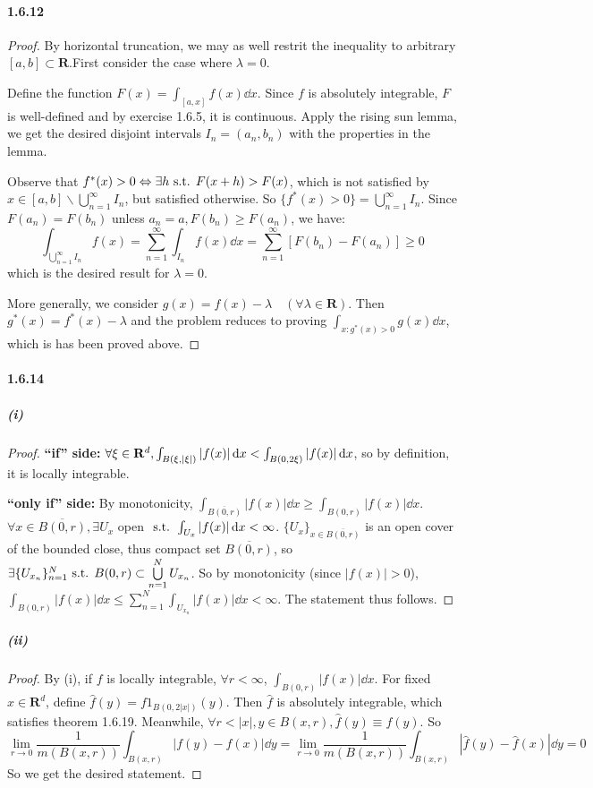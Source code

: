 \documentclass{article}
\begin{document}
\paragraph{1.6.12}
\begin{proof}
By horizontal truncation, we may as well restrit the inequality to arbitrary $[a,b]\subset \mathbf{R}$.First consider the case where $\lambda=0$.

Define the function $F(x)=\int_{[a,x]}f(x)\dd x$. Since $f$ is absolutely integrable, $F$ is well-defined and by exercise 1.6.5, it is continuous. Apply the rising sun lemma, we get the desired disjoint intervals $I_n=(a_n,b_n)$ with the properties in the lemma.

Observe that $f^*(x)>0\Leftrightarrow \exists h\text{ s.t. } F(x+h)>F(x)$, which is not satisfied by $x\in [a,b]\backslash \bigcup\limits_{n=1}^{\infty}I_n$, but satisfied otherwise. So $\{f^*(x)>0\}=\bigcup\limits_{n=1}^\infty I_n$. Since $F(a_n)=F(b_n)$ unless $a_n=a, F(b_n)\geq F(a_n)$, we have:
\[\int_{\bigcup_{n=1}^\infty I_n}f(x)=\sum_{n=1}^\infty \int_{I_n}f(x)\dd x=\sum_{n=1}^\infty [F(b_n)-F(a_n)]\geq 0\]
which is the desired result for $\lambda=0$.

More generally, we consider $g(x)=f(x)-\lambda\quad (\forall\lambda\in\mathbf{R})$. Then $g^*(x)=f^*(x)-\lambda$ and the problem reduces to proving $\int_{x:g^*(x)>0}g(x)\dd x$, which is has been proved above.
\end{proof}

\paragraph{1.6.14}
\subparagraph{(i)}
\begin{proof}
\textbf{``if'' side:} $\forall \xi\in\mathbf{R}^d, \int_{B(\xi,|\xi|)}|f(x)|\,\mathrm{d} x<\int_{B(0,2\xi)}|f(x)|\,\mathrm{d} x$, so by definition, it is locally integrable.

\textbf{``only if'' side:} By monotonicity, $\int_{\overline{B(0,r)}}|f(x)|\dd x\geq \int_{B(0,r)}|f(x)|\dd x$. $\forall x\in \overline{B(0,r)},\exists U_x$ open $\text{ s.t. } \int_{U_x}|f(x)|\,\mathrm{d} x<\infty$. $\{U_x\}_{x\in\overline{B(0,r)}}$ is an open cover of the bounded close, thus compact set $\overline{B(0,r)}$, so $\exists \{U_{x_n}\}_{n=1}^N\text{ s.t. } B(0,r)\subset \bigcup\limits_{n=1}^{N}U_{x_n}$. So by monotonicity (since $|f(x)|>0$), $\int_{B(0,r)}|f(x)|\dd x\leq\sum\limits_{n=1}^N\int_{U_{x_n}}|f(x)|\dd x<\infty$. The statement thus follows.
\end{proof}
\subparagraph{(ii)}
\begin{proof}
By (i), if $f$ is locally integrable, $\forall r<\infty$, $\int_{B(0,r)}|f(x)|\dd x$. For fixed $x\in\mathbf{R}^d$, define $\hat{f}(y)=f1_{B(0,2|x|)}(y)$. Then $\hat{f}$ is absolutely integrable, which satisfies theorem 1.6.19. Meanwhile, $\forall r<|x|, y\in B(x,r), \hat{f}(y)\equiv f(y)$. So 
\[\lim_{r\to 0}\frac{1}{m(B(x,r))}\int_{B(x,r)}|f(y)-f(x)|\dd y=\lim_{r\to 0}\frac{1}{m(B(x,r))}\int_{B(x,r)}|\hat{f}(y)-\hat{f}(x)|\dd y=0\]
So we get the desired statement.
\end{proof}
\end{document}
